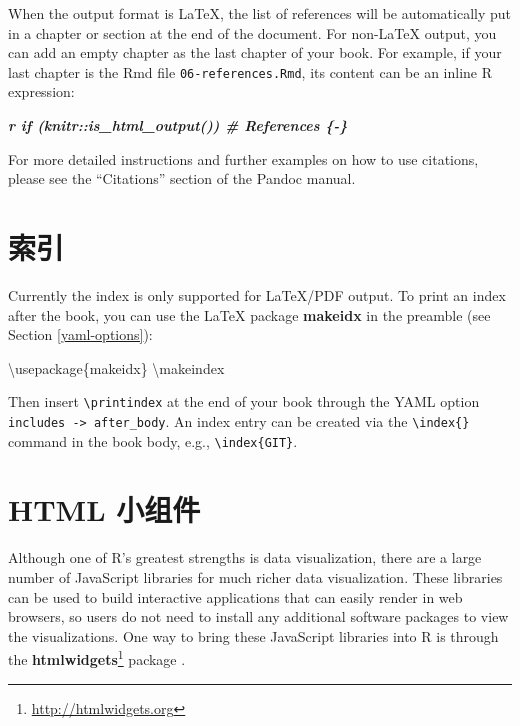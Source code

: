 \documentclass[
  12pt,
]{krantz}
\newenvironment{Shaded}{\begin{snugshade}}{\end{snugshade}}
\newcommand{\BuiltInTok}[1]{#1}
\newcommand{\ExtensionTok}[1]{#1}
\newcommand{\FunctionTok}[1]{\textcolor[rgb]{0.00,0.00,0.00}{#1}}
\newcommand{\InformationTok}[1]{\textcolor[rgb]{0.56,0.35,0.01}{\textbf{\textit{#1}}}}
\newcommand{\NormalTok}[1]{#1}
\renewcommand{\href}[2]{#2\footnote{\url{#1}}}
\theoremstyle{definition}
\theoremstyle{definition}
\theoremstyle{definition}
\theoremstyle{definition}
\theoremstyle{remark}
\begin{document}
When the output format is LaTeX, the list of references will be automatically put in a chapter or section at the end of the document. For non-LaTeX output, you can add an empty chapter as the last chapter of your book. For example, if your last chapter is the Rmd file \texttt{06-references.Rmd}, its content can be an inline R expression:

\begin{Shaded}
\begin{Highlighting}[]
\InformationTok{\textasciigrave{}r if (knitr::is\_html\_output()) \textquotesingle{}\# References \{{-}\}\textquotesingle{}\textasciigrave{}}
\end{Highlighting}
\end{Shaded}

For more detailed instructions and further examples on how to use citations, please see the ``Citations'' section of the Pandoc manual.

\hypertarget{latex-index}{%
\section{索引}\label{latex-index}}

Currently the index is only supported for LaTeX/PDF output. To print an index after the book, you can use the LaTeX package \textbf{makeidx} in the preamble (see Section \ref{yaml-options}):

\begin{Shaded}
\begin{Highlighting}[]
\BuiltInTok{\textbackslash{}usepackage}\NormalTok{\{}\ExtensionTok{makeidx}\NormalTok{\}}
\FunctionTok{\textbackslash{}makeindex}
\end{Highlighting}
\end{Shaded}

Then insert \texttt{\textbackslash{}printindex} at the end of your book through the YAML option \texttt{includes\ -\textgreater{}\ after\_body}. An index entry can be created via the \texttt{\textbackslash{}index\{\}} command in the book body, e.g., \texttt{\textbackslash{}index\{GIT\}}.

\hypertarget{html-ux5c0fux7ec4ux4ef6}{%
\section{HTML 小组件}\label{html-ux5c0fux7ec4ux4ef6}}

Although one of R's greatest strengths is data visualization, there are a large number of JavaScript libraries for much richer data visualization. These libraries can be used to build interactive applications that can easily render in web browsers, so users do not need to install any additional software packages to view the visualizations. One way to bring these JavaScript libraries into R is through the \href{http://htmlwidgets.org}{\textbf{htmlwidgets}} package \citep{R-htmlwidgets}.
\end{document}
